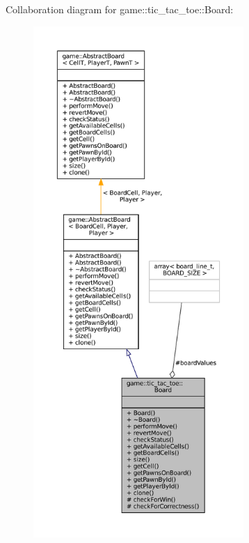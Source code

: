 Collaboration diagram for game\+:\+:tic\+\_\+tac\+\_\+toe\+:\+:Board\+:
\nopagebreak
\begin{figure}[H]
\begin{center}
\leavevmode
\includegraphics[height=550pt]{classgame_1_1tic__tac__toe_1_1_board__coll__graph}
\end{center}
\end{figure}

